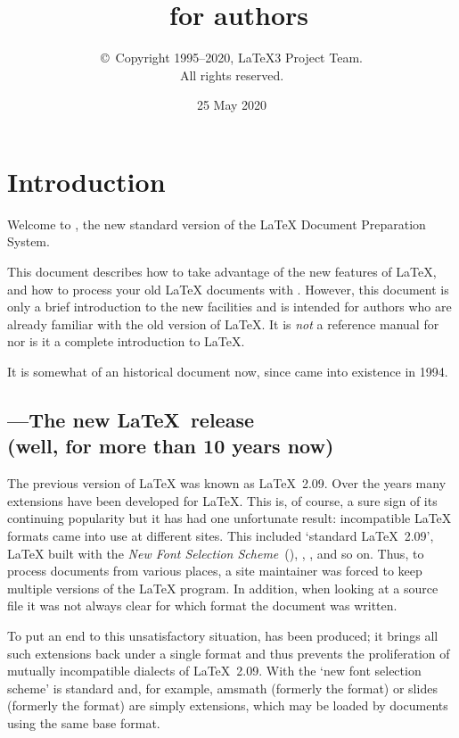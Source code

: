 \documentclass{ltxguide}[2001/05/28]
\title{\LaTeXe~for authors}
\author{\copyright~Copyright 1995--2020, \LaTeX3 Project Team.\\
   All rights reserved.}
\date{25 May 2020}
\begin{document}
\maketitle

\tableofcontents

\section{Introduction}

Welcome to \LaTeXe, the new standard version of the \LaTeX{} Document
Preparation System.

This document describes how to take advantage of the new features of
\LaTeX, and how to process your old \LaTeX{} documents with
\LaTeXe. However, this document is only a brief introduction to the
new facilities and is intended for authors who are already familiar
with the old version of \LaTeX{}.  It is \emph{not} a reference manual
for \LaTeXe{} nor is it a complete introduction to \LaTeX.

It is somewhat of an historical document now, since \LaTeXe{} came into
existence in 1994.

\subsection[\LaTeXe---The new \LaTeX~release]
  {\LaTeXe---The new \LaTeX~release\\ (well, for more than 10 years now)}

The previous version of \LaTeX{} was known as \LaTeX~2.09.  Over the
years many extensions have been developed for \LaTeX.  This is, of
course, a sure sign of its continuing popularity but it has had one
unfortunate result: incompatible \LaTeX{} formats came into use at
different sites.  This included `standard \LaTeX~2.09', \LaTeX{} built
with the \emph{New Font Selection Scheme}~(\NFSS), \SLiTeX, \AmSLaTeX,
and so on.  Thus, to process documents from various places, a site
maintainer was forced to keep multiple versions of the \LaTeX{}
program.  In addition, when looking at a source file it was not always
clear for which format the document was written.

To put an end to this unsatisfactory situation, \LaTeXe{} has been
produced; it brings all such extensions back under a single format and
thus prevents the proliferation of mutually incompatible dialects of
\LaTeX~2.09.  With \LaTeXe{} the `new font selection scheme' is
standard and, for example, \textsf{amsmath} (formerly the \AmSLaTeX{}
format) or \textsf{slides} (formerly the \SLiTeX{} format) are simply
extensions, which may be loaded by documents using the same base format.
\end{document}
